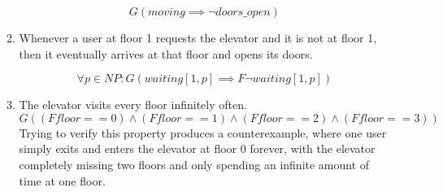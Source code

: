 \documentclass{article}
\begin{document}
\begin{enumerate}
\begin{enumerate}
      \[ G (moving \implies \neg doors\_open )\]
    \item Whenever a user at floor 1 requests the elevator and it is not at
      floor 1, then it eventually arrives at that floor and opens its doors.

      \[ \forall p\in NP: G (waiting[1,p] \implies F \neg waiting[1,p] )\]
    \item The elevator visits every floor infinitely often.
      \[G \left( (F floor == 0) \wedge (F floor == 1)
      \wedge (F floor == 2) \wedge (F floor == 3) \right) \]
      Trying to verify this property produces a counterexample, where one
      user simply exits and enters the elevator at floor 0
      forever, with the elevator completely missing two floors
      and only spending an infinite amount of time at one floor.
  \end{enumerate}
\end{enumerate}

%
%
\end{document}
